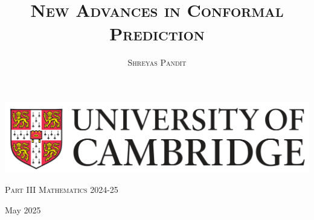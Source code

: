 \documentclass[11pt, titlepage]{article} %
\title{\textsc{New Advances in Conformal Prediction}}
\author{\textsc{Shreyas Pandit}}
\date{}
\numberwithin{equation}{section}
\theoremstyle{definition}
\numberwithin{theorem}{section}
\numberwithin{lemma}{section}
\numberwithin{corollary}{section}
\numberwithin{proposition}{section}
\numberwithin{definition}{section}
\numberwithin{remark}{section}
\begin{document}

\makeatletter
\begin{titlepage}
    \begin{flushright}
        \includegraphics[scale=0.07]{Figures/logo.png} 
    \end{flushright}

    \begin{center}
        \vspace*{\fill}

        {\LARGE \textsc{Part III Mathematics 2024-25}\par}
        
        \vspace{1cm}

        {\Huge \bfseries \@title\par} 
        
        \vspace{1cm} %
        
        {\LARGE \@author\par}
        
        \vspace*{\fill} %
        
        {\large May 2025 \par} 
        
    \end{center}
\end{titlepage}
\makeatother
\end{document}
